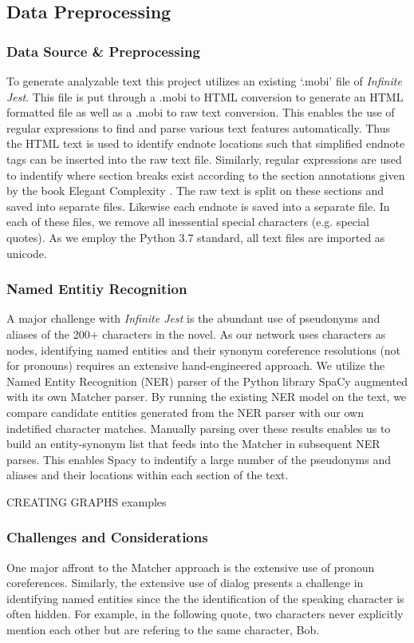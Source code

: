 \documentclass[sigconf]{acmart}
\newcommand{\infinitejest}{{\em Infinite Jest}\xspace}
\begin{document}
\subsection{Data Preprocessing}
\subsubsection{Data Source \& Preprocessing}
To generate analyzable text this project utilizes an existing `.mobi' file of \infinitejest. This file is put through a .mobi to HTML conversion to generate an HTML formatted file as well as a .mobi to raw text conversion. This enables the use of regular expressions to find and parse various text features automatically. Thus the HTML text is used to identify endnote locations such that simplified endnote tags can be inserted into the raw text file. Similarly, regular expressions are used to indentify where section breaks exist according to the section annotations given by the book Elegant Complexity \cite{carlisle_2007}. The raw text is split on these sections and saved into separate files. Likewise each endnote is saved into a separate file. In each of these files, we remove all inessential special characters (e.g. special quotes). As we employ the Python 3.7 standard, all text files are imported as unicode.

\subsubsection{Named Entitiy Recognition}

A major challenge with \infinitejest is the abundant use of pseudonyms and aliases of the 200+ characters in the novel. As our network uses characters as nodes, identifying named entities and their synonym coreference resolutions (not for pronouns) requires an extensive hand-engineered approach. We utilize the Named Entity Recognition (NER) parser of the Python library SpaCy \cite{spacy2} augmented with its own Matcher parser. By running the existing NER model on the text, we compare candidate entities generated from the NER parser with our own indetified character matches. Manually parsing over these results enables us to build an entity-synonym list that feeds into the Matcher in subsequent NER parses. This enables Spacy to indentify a large number of the pseudonyms and aliases and their locations within each section of the text.

CREATING GRAPHS examples

\subsubsection{Challenges and Considerations}
One major affront to the Matcher approach is the extensive use of pronoun coreferences. Similarly, the extensive use of dialog presents a challenge in identifying named entities since the the identification of the speaking character is often hidden. For example, in the following quote, two characters never explicitly mention each other but are refering to the same character, Bob.
\end{document}
